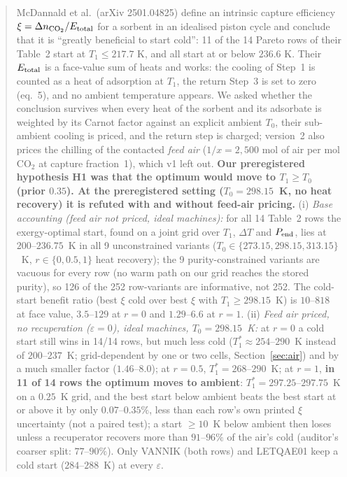 \documentclass[10pt]{article}
\begin{document}
\begin{abstract}
McDannald et al.\ (arXiv 2501.04825) define an intrinsic capture efficiency $\xi=\Delta n_{\rm CO_2}/E_{\rm total}$ for a sorbent in an
idealised piston cycle and conclude that it is ``greatly beneficial to start cold'': 11 of the 14 Pareto rows of their Table~2 start
at $T_1\le 217.7$ K, and all start at or below $236.6$ K. Their $E_{\rm total}$ is a face-value sum of heats and works: the cooling of Step~1 is counted as a heat of adsorption at $T_1$,
the return Step~3 is set to zero (eq.~5), and no ambient temperature appears. We asked whether the conclusion
survives when every heat of the sorbent and its adsorbate is weighted by its Carnot factor against an explicit ambient $T_0$, their sub-ambient cooling is priced, and the
return step is charged; version~2 also prices the chilling of the contacted \emph{feed air} ($1/x=2{,}500$ mol of air per mol CO$_2$ at capture fraction~1), which v1 left out.
\textbf{Our preregistered hypothesis H1 was that the optimum would move to $T_1\ge T_0$ (prior $0.35$). At the preregistered setting ($T_0=298.15$~K, no heat recovery) it is refuted with and without feed-air pricing.}
(i) \emph{Base accounting (feed air not priced, ideal machines):} for all 14 Table~2 rows the exergy-optimal start, found on a joint grid over $T_1$, $\Delta T$ and $P_{\rm end}$, lies at $200$--$236.75$~K
in all 9 unconstrained variants ($T_0\in\{273.15,298.15,313.15\}$~K, $r\in\{0,0.5,1\}$ heat recovery); the 9 purity-constrained variants are vacuous for every row (no warm path on our grid reaches the stored purity), so 126 of the 252 row-variants are informative, not 252.
The cold-start benefit ratio (best $\xi$ cold over best $\xi$ with $T_1\ge298.15$~K) is $10$--$818$ at face value, $3.5$--$129$ at $r=0$ and $1.29$--$6.6$ at $r=1$.
(ii) \emph{Feed air priced, no recuperation ($\varepsilon=0$), ideal machines, $T_0=298.15$~K:} at $r=0$ a cold start still wins in 14/14 rows, but much less cold ($T_1^\ast\approx254$--$290$~K instead of $200$--$237$~K; grid-dependent by one or two cells, Section~\ref{sec:air}) and by a much smaller factor ($1.46$--$8.0$); at $r=0.5$, $T_1^\ast=268$--$290$~K; at $r=1$, \textbf{in 11 of 14 rows the optimum moves to ambient}: $T_1^\ast=297.25$--$297.75$~K on a $0.25$~K grid, and the best start below ambient beats the best start at or above it by only $0.07$--$0.35\%$, less than each row's own printed $\xi$ uncertainty (not a paired test); a start $\ge10$~K below ambient then loses unless a recuperator recovers more than $91$--$96\%$ of the air's cold (auditor's coarser split: $77$--$90\%$). Only VANNIK (both rows) and LETQAE01 keep a cold start ($284$--$288$~K) at every $\varepsilon$.

\end{abstract}
\end{document}
